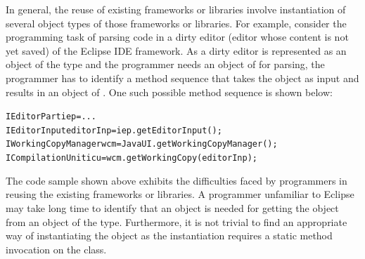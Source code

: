 \documentclass{fp035-thummalapenta}
\begin{document}
In general, the reuse of existing frameworks or libraries involve
instantiation of several object types of those frameworks or
libraries. For example, consider the programming task of parsing
code in a dirty editor (editor whose content is not yet saved) of
the Eclipse IDE framework. As a dirty editor is represented as an
object of the  type and the programmer needs an
object of  for parsing, the programmer has
to identify a method sequence that takes the  object
as input and results in an object of . One
such possible method sequence is shown below:

\begin{CodeOut}
\begin{alltt}
IEditorPart iep = ...
IEditorInput editorInp = iep.getEditorInput();
IWorkingCopyManager wcm = JavaUI.getWorkingCopyManager();
ICompilationUnit icu = wcm.getWorkingCopy(editorInp);
\end{alltt}
\end{CodeOut}

The code sample shown above exhibits the difficulties faced by
programmers in reusing the existing frameworks or libraries. A
programmer unfamiliar to Eclipse may take
long time to identify that an  object 
is needed for getting the
 object from an object of the
 type. Furthermore, it is not trivial to find
an appropriate way of instantiating the
 object as the instantiation requires a static
method invocation on the  class.
\end{document}
